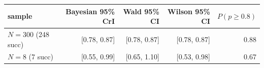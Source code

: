 \begin{tabular}{lrrrr}
\toprule
sample & Bayesian 95\% CrI & Wald 95\% CI & Wilson 95\% CI & $P(p\!\ge\!0.8)$ \\
\midrule
$N=300$ (248 succ) & [0.78, 0.87] & [0.78, 0.87] & [0.78, 0.87] & 0.88 \\
$N=8$ (7 succ) & [0.55, 0.99] & [0.65, 1.10] & [0.53, 0.98] & 0.67 \\
\bottomrule
\end{tabular}
